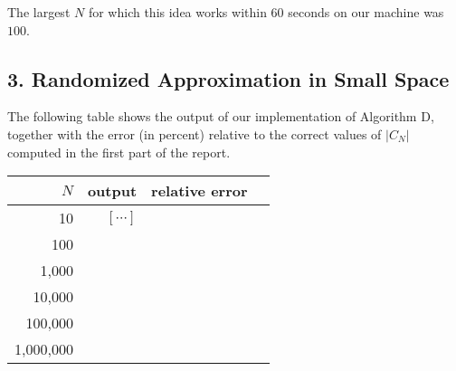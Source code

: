 \documentclass{tufte-handout}
\begin{document}
The largest $N$ for which this idea works within 60 seconds on our
machine was $100$.


\subsection{3. Randomized Approximation in Small Space}

The following table shows the output of our implementation of
Algorithm D, together with the error (in percent) relative to the
correct values of $|C_N|$ computed in the first part of the report.

\medskip
\begin{tabular}{rrrr}
  \toprule
  $N$ &   output & relative error \\
  \midrule
  10 & $[\cdots]$ &
  \\
  100 & \\
  1,000 & \\
  10,000 & \\
  100,000 & \\
  1,000,000 & \\
  \bottomrule
\end{tabular}
\end{document}
